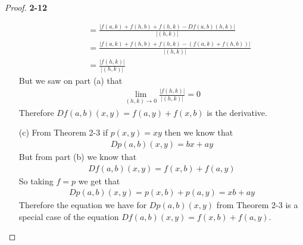 \documentclass[11pt]{article}
\theoremstyle{definition}
\begin{document}
\begin{proof}{\textbf{2-12}}
\begin{itemize}
\begin{align*}
    &\quad= \frac{|f(a, k) + f(h, b) + f(h,k) - Df(a,b)(h,k)|}{|(h,k)|}\\
    &\quad= \frac{|f(a, k) + f(h, b) + f(h,k) - (f(a,k) + f(h,b))|}{|(h,k)|}\\
    &\quad= \frac{|f(h,k)|}{|(h,k)|}
\end{align*}
But we saw on part (a) that
\begin{align*}
    \lim_{(h,k)\to 0} \frac{|f(h,k)|}{|(h,k)|} = 0
\end{align*}
Therefore $Df(a,b)(x,y) = f(a,y) + f(x,b)$ is the derivative.
\item[(c)] From Theorem 2-3 if $p(x,y) = xy$ then we know that
\begin{align*}
    Dp(a,b)(x,y) = bx + ay
\end{align*}
But from part (b) we know that
\begin{align*}
    Df(a,b)(x,y) = f(x,b) + f(a,y)
\end{align*}
So taking $f = p$ we get that
\begin{align*}
    Dp(a,b)(x,y) = p(x,b) + p(a,y) = xb + ay
\end{align*}
Therefore the equation we have for $Dp(a,b)(x,y)$ from Theorem 2-3 is a special
case of the equation $Df(a,b)(x,y) = f(x,b) + f(a,y)$.
\end{itemize}
\end{proof}
\end{document}
